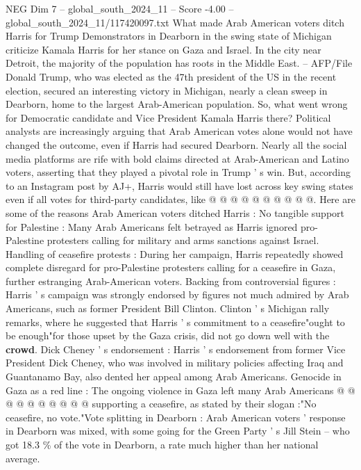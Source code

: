 \begin{textsample}{NEG Dim 7 – global\_south\_2024\_11 – Score -4.00 – global\_south\_2024\_11/117420097.txt}  \label{ex:f7_neg_437}
What made Arab American voters ditch Harris for Trump Demonstrators in Dearborn in the swing state of Michigan criticize Kamala Harris for her stance on Gaza and Israel.
In the city near Detroit, the majority of the population has roots in the Middle East. -- AFP/File Donald Trump, who was elected as the 47th president of the US in the recent election, secured an interesting victory in Michigan, nearly a clean sweep in Dearborn, home to the largest Arab-American population.
So, what went wrong for Democratic candidate and Vice President Kamala Harris there?
Political analysts are increasingly arguing that Arab American votes alone would not have changed the outcome, even if Harris had secured Dearborn.
Nearly all the social media platforms are rife with bold claims directed at Arab-American and Latino voters, asserting that they played a pivotal role in Trump ' s win.
But, according to an Instagram post by AJ+, Harris would still have lost across key swing states even if all votes for third-party candidates, like @ @ @ @ @ @ @ @ @ @.
Here are some of the reasons Arab American voters ditched Harris : No tangible support for Palestine : Many Arab Americans felt betrayed as Harris ignored pro-Palestine protesters calling for military and arms sanctions against Israel.
Handling of ceasefire protests : During her campaign, Harris repeatedly showed complete disregard for pro-Palestine protesters calling for a ceasefire in Gaza, further estranging Arab-American voters.
Backing from controversial figures : Harris ' s campaign was strongly endorsed by figures not much admired by Arab Americans, such as former President Bill Clinton.
Clinton ' s Michigan rally remarks, where he suggested that Harris ' s commitment to a ceasefire"ought to be enough"for those upset by the Gaza crisis, did not go down well with the \textbf{crowd}.
Dick Cheney ' s endorsement : Harris ' s endorsement from former Vice President Dick Cheney, who was involved in military policies affecting Iraq and Guantanamo Bay, also dented her appeal among Arab Americans.
Genocide in Gaza as a red line : The ongoing violence in Gaza left many Arab Americans @ @ @ @ @ @ @ @ @ @ supporting a ceasefire, as stated by their slogan :"No ceasefire, no vote."Vote splitting in Dearborn : Arab American voters ' response in Dearborn was mixed, with some going for the Green Party ' s Jill Stein -- who got 18.3 \% of the vote in Dearborn, a rate much higher than her national average.

\end{textsample}
